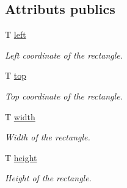 \subsection*{Attributs publics}
\begin{DoxyCompactItemize}
\item 
\mbox{\label{classsf_1_1Rect_aa49960fa465103d9cb7069ceb25c7c32}} 
T \hyperlink{classsf_1_1Rect_aa49960fa465103d9cb7069ceb25c7c32}{left}
\begin{DoxyCompactList}\small\item\em Left coordinate of the rectangle. \end{DoxyCompactList}\item 
\mbox{\label{classsf_1_1Rect_abd3d3a2d0ad211ef0082bd0aa1a5c0e3}} 
T \hyperlink{classsf_1_1Rect_abd3d3a2d0ad211ef0082bd0aa1a5c0e3}{top}
\begin{DoxyCompactList}\small\item\em Top coordinate of the rectangle. \end{DoxyCompactList}\item 
\mbox{\label{classsf_1_1Rect_a4dd5b9d4333bebbc51bd309298fd500f}} 
T \hyperlink{classsf_1_1Rect_a4dd5b9d4333bebbc51bd309298fd500f}{width}
\begin{DoxyCompactList}\small\item\em Width of the rectangle. \end{DoxyCompactList}\item 
\mbox{\label{classsf_1_1Rect_a6fa0fc7de1636d78cae1a1b54eef95cd}} 
T \hyperlink{classsf_1_1Rect_a6fa0fc7de1636d78cae1a1b54eef95cd}{height}
\begin{DoxyCompactList}\small\item\em Height of the rectangle. \end{DoxyCompactList}\end{DoxyCompactItemize}
